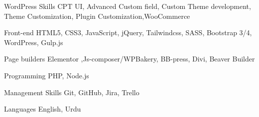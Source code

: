 

\begin{cvskills}
  \cvskill
    {WordPress Skills} %
    {CPT UI, Advanced Custom field, Custom Theme development, Theme Customization, Plugin Customization,WooCommerce}  %

  \cvskill
    {Front-end} %
    {HTML5, CSS3, JavaScript, jQuery, Tailwindcss, SASS, Bootstrap 3/4, WordPress, Gulp.js} %

  \cvskill
    {Page builders } %
    {Elementor ,Js-composer/WPBakery, BB-press, Divi, Beaver Builder  } %

  \cvskill
    {Programming} %
    {PHP, Node.js} %

  \cvskill
    {Management Skills} %
    {Git, GitHub, Jira, Trello} %

  \cvskill
    {Languages} %
    {English, Urdu} %

\end{cvskills}
